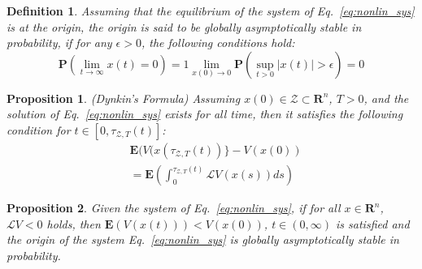\documentclass[letterpaper, 10pt, conference]{ieeeconf}
\newtheorem{prop}{Proposition}
\newtheorem{definition}{Definition}
\begin{document}
	\begin{definition} \cite{khasminskii2011stochastic}
		Assuming that the equilibrium of the system of Eq.~\ref{eq:nonlin_sys} is at the origin, the origin is said to be globally asymptotically stable in probability, if for any $\epsilon > 0$, the following conditions hold:
		\begin{subequations}
			\label{eq:stochastic_stable}
			\begin{equation}\label{eq:stochastic_stable1}
			\mathbf{P}(\lim_{t \to \infty} x(t)=0)=1
			\end{equation}
			\begin{equation}\label{eq:stochastic_stable2}
			\lim \limits_{x(0) \rightarrow 0} \mathbf{P}(\sup_{t > 0} \vert x(t) \vert > \epsilon)=0
			\end{equation}
		\end{subequations}
	\end{definition}
	
	\vspace{0.3cm}
	
	\begin{prop} (Dynkin's Formula) \cite{pinsky1987stochastic}
		Assuming $x(0) \in \mathcal{Z} \subset \mathbf{R}^n$, $T>0$, and the solution of Eq.~\ref{eq:nonlin_sys} exists for all time, then it satisfies the following condition for $t \in [0,\tau_{\mathcal{Z}, T}(t)]$:
		\begin{equation}\label{dynkin}
		\begin{split}
		&\mathbf{E}(V(x(\tau_{\mathcal{Z}, T}(t))\}-V(x(0))\\
		&=\mathbf{E}(\int_{0}^{\tau_{\mathcal{Z}, T}(t)} \mathcal{L}V(x(s))ds)
		\end{split}
		\end{equation}	
	\end{prop}
	
		\vspace{0.3cm}
	
	\begin{prop}\cite{khasminskii2011stochastic}
		Given the system of Eq.~\ref{eq:nonlin_sys}, if for all $x \in \mathbf{R}^n$, $\mathcal{L}V <0$ holds, then $\mathbf{E}(V(x(t))) < V(x(0))$, $ t \in (0, \infty)$ is satisfied and the origin of the system Eq.~\ref{eq:nonlin_sys} is globally asymptotically stable in probability.
	\end{prop}

	
\end{document}
